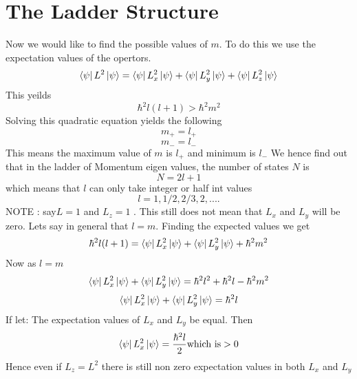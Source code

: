 \documentclass{article}
\begin{document}
\section{The Ladder Structure}
Now we would like to find the possible values of  $m$. To do this we use the expectation values of the opertors.
\begin{equation}
\bra{\psi}L^2\ket{\psi}=\bra{\psi}L_{x}^2\ket{\psi}+\bra{\psi}L_{y}^2\ket{\psi}+ \bra{\psi}L_{z}^2\ket{\psi}
\end{equation}
This yeilds
\begin{equation}
\hbar^2l(l+1) > \hbar^2 m^2
\end{equation}
Solving this quadratic equation yields the following 
\begin{equation}
m_+= l_+ 
\end{equation}
\begin{equation}
m_-= l_-
\end{equation}
This means the maximum value of $m$ is $l_+$ and minimum is $l_-$
We hence find out that in the ladder of Momentum eigen values, the number of states $N$ is 
\begin{equation}
N=2l+1
\end{equation}
which means that $l$ can only take integer or half int values
\begin{equation}
l=1,1/2,2/3,2,....
\end{equation}
NOTE : say$ L = 1$ and $L_z= 1$ . This still does not mean that $L_x$ and $L_y$ will be zero. Lets say in general that $l=m$. Finding the expected values we get 
\begin{equation}
\hbar^2 l(l+1)= \bra{\psi}L_{x}^2\ket{\psi}+\bra{\psi}L_{y}^2\ket{\psi}+\hbar^2 m^2
\end{equation}
Now as $l=m$
\begin{equation}
\bra{\psi}L_{x}^2\ket{\psi}+\bra{\psi}L_{y}^2\ket{\psi}=\hbar^2 l^2+\hbar^2 l - \hbar^2 m^2
\end{equation}
\begin{equation}
\bra{\psi}L_{x}^2\ket{\psi}+\bra{\psi}L_{y}^2\ket{\psi}=\hbar^2 l
\end{equation}
If let: The expectation values of $L_x$ and $L_y$ be equal. Then 
\begin{equation}
\bra{\psi}L_{x}^2\ket{\psi}=\frac{\hbar^2 l}{2} \text{which is} >0
\end{equation}
Hence even if $ L_z=L^2$ there is still non zero expectation values in both $L_x$ and $L_y$
\end{document}
